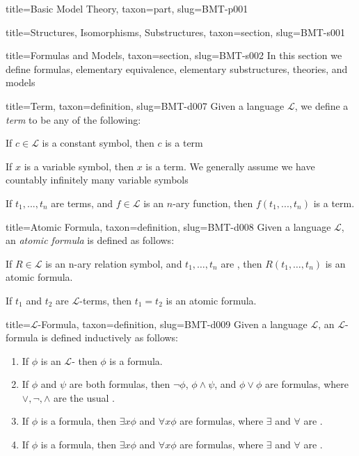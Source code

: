 \documentclass[a4paper]{article}
\begin{document}
\begin{tree}{title={Basic Model Theory}, taxon={part}, slug={BMT-p001}}
\begin{tree}{title={Structures, Isomorphisms, Substructures}, taxon={section}, slug={BMT-s001}}
\end{tree}


  
  
\begin{tree}{title={Formulas and Models}, taxon={section}, slug={BMT-s002}}
In this section we define formulas, elementary equivalence, elementary substructures, theories, and models
\begin{tree}{title={Term}, taxon={definition}, slug={BMT-d007}}
Given a language \(\mathcal {L}\), we define a \emph{term} to be any of the following:\par{If \(c \in   \mathcal {L}\) is a constant symbol, then \(c\) is a term}\par{If \(x\) is a variable symbol, then \(x\) is a term. We generally assume we have countably infinitely many variable symbols}\par{If \(t_1,..., t_n\) are terms, and \(f \in   \mathcal {L}\) is an \(n\)-ary function, then \(f(t_1,..., t_n)\) is a term.}
\end{tree}

\begin{tree}{title={Atomic Formula}, taxon={definition}, slug={BMT-d008}}
Given a language \(\mathcal {L}\), an \emph{atomic formula} is defined as follows:\par{If \(R \in   \mathcal {L}\) is an n-ary relation symbol, and \(t_1, \dots , t_n\) are , then \(R(t_1, \dots , t_n)\) is an atomic formula.}\par{If \(t_1\) and \(t_2\) are \(\mathcal {L}\)-terms, then \(t_1 = t_2\) is an atomic formula. }
\end{tree}

\begin{tree}{title={\(\mathcal {L}\)-Formula}, taxon={definition}, slug={BMT-d009}}
Given a language \(\mathcal {L}\), an \(\mathcal {L}\)-formula is defined inductively as follows:\par{\begin{enumerate}
\item{
            If \(\phi\) is an \(\mathcal {L}\)- then \(\phi\) is a formula.
        }
        \item{
            If \(\phi\) and \(\psi\) are both formulas, then \(\neg \phi\), \(\phi   \land   \psi\), and 
            \(\phi \lor \phi\) are formulas, where \(\lor , \neg , \land\) are the usual .
        }
        \item{
            If \(\phi\) is a formula, then \(\exists  x  \phi\) and \(\forall  x  \phi\) are formulas, 
            where \(\exists\) and \(\forall\) are .
        }
        \item{
            If \(\phi\) is a formula, then \(\exists  x  \phi\) and \(\forall  x  \phi\) are formulas, 
            where \(\exists\) and \(\forall\) are .
        }
\end{enumerate}}
\end{tree}


\end{tree}
\end{tree}
\end{document}
